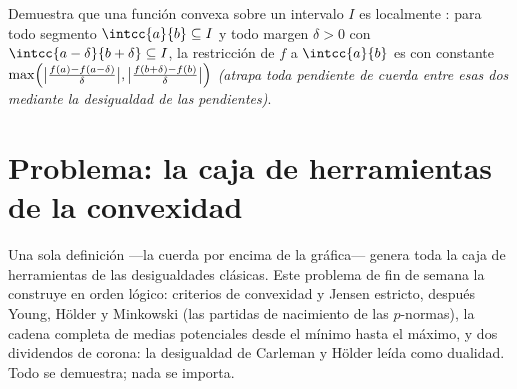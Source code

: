 \begin{exercise}[$\star\star\star$]\label{exo:b2:realfun:12}
Demuestra que una función convexa sobre un intervalo
\emph{} $I$ es localmente : para todo
segmento $\intcc{a}{b} \subseteq I$ y todo margen $\delta > 0$ con
$\intcc{a - \delta}{b + \delta} \subseteq I$, la restricción de $f$
a $\intcc{a}{b}$ es  con constante
$\max\Bigl(\bigl|\frac{f(a) - f(a - \delta)}{\delta}\bigr|,
\bigl|\frac{f(b + \delta) - f(b)}{\delta}\bigr|\Bigr)$
\emph{(atrapa toda pendiente de cuerda entre esas dos mediante la
desigualdad de las pendientes)}.
\end{exercise}

\section{Problema: la caja de herramientas de la convexidad}

Una sola definición ---la cuerda por encima de la gráfica--- genera
toda la caja de herramientas de las desigualdades clásicas. Este
problema de fin de semana la construye en orden lógico: criterios de
convexidad y Jensen estricto, después Young, Hölder y Minkowski (las
partidas de nacimiento de las $p$-normas), la cadena completa de
medias potenciales desde el mínimo hasta el máximo, y dos dividendos
de corona: la desigualdad de Carleman y Hölder leída como dualidad.
Todo se demuestra; nada se importa.

